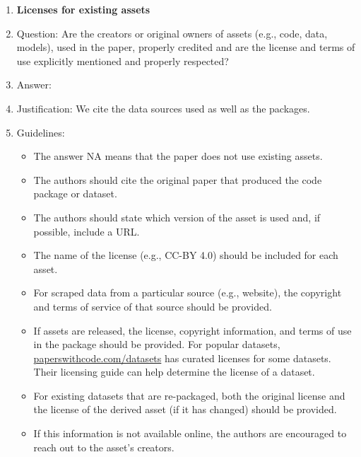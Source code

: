 \documentclass{article}
\begin{document}
\begin{enumerate}
\item {\bf Licenses for existing assets}
    \item[] Question: Are the creators or original owners of assets (e.g., code, data, models), used in the paper, properly credited and are the license and terms of use explicitly mentioned and properly respected?
    \item[] Answer: \answerYes{}
    \item[] Justification: We cite the data sources used as well as the packages.
    \item[] Guidelines:
    \begin{itemize}
        \item The answer NA means that the paper does not use existing assets.
        \item The authors should cite the original paper that produced the code package or dataset.
        \item The authors should state which version of the asset is used and, if possible, include a URL.
        \item The name of the license (e.g., CC-BY 4.0) should be included for each asset.
        \item For scraped data from a particular source (e.g., website), the copyright and terms of service of that source should be provided.
        \item If assets are released, the license, copyright information, and terms of use in the package should be provided. For popular datasets, \url{paperswithcode.com/datasets} has curated licenses for some datasets. Their licensing guide can help determine the license of a dataset.
        \item For existing datasets that are re-packaged, both the original license and the license of the derived asset (if it has changed) should be provided.
        \item If this information is not available online, the authors are encouraged to reach out to the asset's creators.
    \end{itemize}


\end{enumerate}
\end{document}
